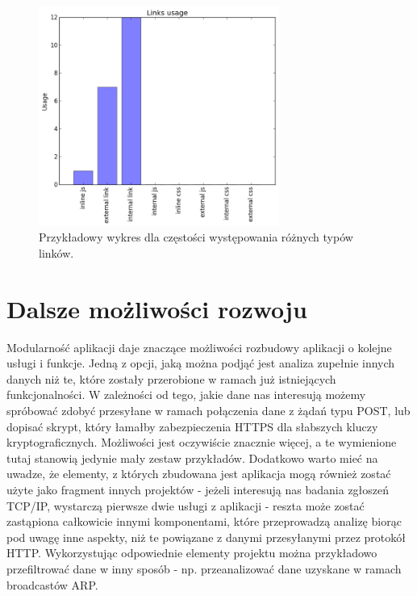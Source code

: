 \documentclass[12pt]{article}
\begin{document}
\begin{figure}[H]
\centering
\caption{Przykładowy wykres dla częstości występowania różnych typów linków.}
\label{img:wykresLinków}
\includegraphics[width=0.7\textwidth]{WykresLinki.png}
\end{figure}

\section {Dalsze możliwości rozwoju}
Modularność aplikacji daje znaczące możliwości rozbudowy aplikacji o kolejne usługi i funkcje. Jedną z opcji, jaką można podjąć jest analiza zupełnie innych danych niż te, które zostały przerobione w ramach już istniejących funkcjonalności. W zależności od tego, jakie dane nas interesują możemy spróbować zdobyć przesyłane w ramach połączenia dane z żądań typu POST, lub dopisać skrypt, który łamałby zabezpieczenia HTTPS dla słabszych kluczy kryptograficznych. Możliwości jest oczywiście znacznie więcej, a te wymienione tutaj stanowią jedynie mały zestaw przykładów.
Dodatkowo warto mieć na uwadze, że elementy, z których zbudowana jest aplikacja mogą również zostać użyte jako fragment innych projektów - jeżeli interesują nas badania zgłoszeń TCP/IP, wystarczą pierwsze dwie usługi z aplikacji - reszta może zostać zastąpiona całkowicie innymi komponentami, które przeprowadzą analizę biorąc pod uwagę inne aspekty, niż te powiązane z danymi przesyłanymi przez protokół HTTP. Wykorzystując odpowiednie elementy projektu można przykładowo przefiltrować dane w inny sposób - np. przeanalizować dane uzyskane w ramach broadcastów ARP.
\end{document}
